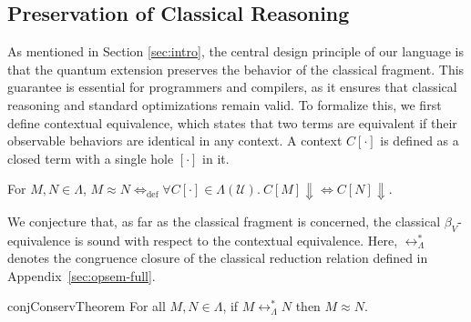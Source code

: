 \subsection{Preservation of Classical Reasoning}
As mentioned in Section \ref{sec:intro}, the central design principle of our language is that the quantum extension preserves the behavior of the classical fragment.
This guarantee is essential for programmers and compilers, as it ensures that classical reasoning and standard optimizations remain valid.
To formalize this, we first define contextual equivalence, which states that two terms are equivalent if their observable behaviors are identical in any context.
A context $C[\cdot]$ is defined as a closed term with a single hole $[\cdot]$ in it.
\begin{dfn} \label{def:contextual-equiv}
  For $M, N \in \Lambda$, $M\approx N \Leftrightarrow_\mathrm{def} \forall C[\cdot]\in\Lambda(\mathcal{U}).\ C[M] \Downarrow \Leftrightarrow C[N] \Downarrow$.
\end{dfn}

We conjecture that, as far as the classical fragment is concerned, the classical $\beta_V$-equivalence is sound with respect to the contextual equivalence.
Here, $\longleftrightarrow^*_\Lambda$ denotes the congruence closure of the classical reduction relation defined in Appendix~\ref{sec:opsem-full}.
\begin{restatable}{conj}{ConservTheorem} \label{conj:conservativity}
  For all $M, N \in \Lambda$, if $M \longleftrightarrow^*_\Lambda N$ then $M \approx N$.
\end{restatable}

